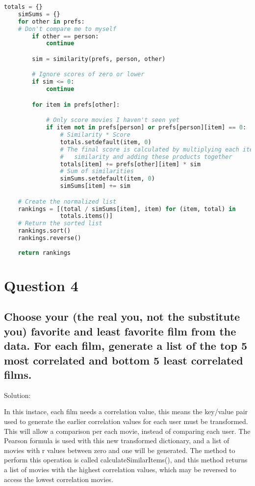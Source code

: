 \documentclass[11pt]{scrartcl} %
\begin{document}
\begin{lstlisting}[language = Python, caption=Function from Programming Collective Intelligence]
totals = {}
    simSums = {}
    for other in prefs:
    # Don't compare me to myself
        if other == person:
            continue

        sim = similarity(prefs, person, other)

        # Ignore scores of zero or lower
        if sim <= 0:
            continue

        for item in prefs[other]:

            # Only score movies I haven't seen yet
            if item not in prefs[person] or prefs[person][item] == 0:
                # Similarity * Score
                totals.setdefault(item, 0)
                # The final score is calculated by multiplying each item by the
                #   similarity and adding these products together
                totals[item] += prefs[other][item] * sim
                # Sum of similarities
                simSums.setdefault(item, 0)
                simSums[item] += sim

    # Create the normalized list
    rankings = [(total / simSums[item], item) for (item, total) in
                totals.items()]
    # Return the sorted list
    rankings.sort()
    rankings.reverse()
 
    return rankings
\end{lstlisting}


\pagebreak

\section*{Question 4}


\subsection*{Choose your (the real you, not the substitute you) favorite and
least favorite film from the data.  For each film, generate a list
of the top 5 most correlated and bottom 5 least correlated films.}

\bigskip\bigskip
\LARGE Solution: \newline\newline\small

\tabto{2.0 cm} In this instace, each film needs a correlation value, this means the key/value pair used to generate the earlier correlation values for each user must be transformed. This will allow a comparison per each movie, instead of comparing each user. The Pearson formula is used with this new transformed dictionary, and a list of movies with r values between zero and one will be generated. The method to perform this operation is called calculateSimilarItems(), and this method returns a list of movies with the highest correlation values, which may be reversed to access the lowest correlation movies. 
\end{document}
